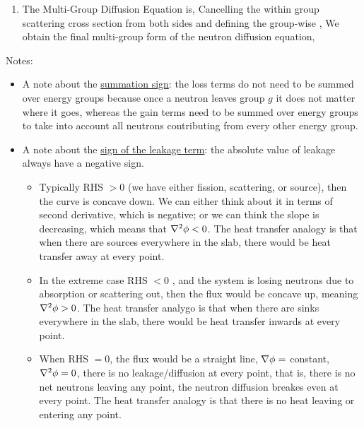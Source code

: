 \documentclass{school-22.211-notes}
\begin{document}
\begin{enumerate}
\begin{enumerate}
  \end{enumerate}

\item The Multi-Group Diffusion Equation is, 
Cancelling the within group scattering cross section from both sides and defining the group-wise , 
We obtain the final multi-group form of the neutron diffusion equation, 
\end{enumerate}
Notes:
\begin{itemize}
\item A note about the \uline{summation sign}: the loss terms do not need to be summed over energy groups because once a neutron leaves group $g$ it does not matter where it goes, whereas the gain terms need to be summed over energy groups to take into account all neutrons contributing from every other energy group. 

\item A note about the \uline{sign of the leakage term}: the absolute value of leakage always have a negative sign. 
  \begin{itemize}
  \item Typically RHS $>0$ (we have either fission, scattering, or source), then the curve is concave down. We can either think about it in terms of second derivative, which is negative; or we can think the slope is decreasing, which means that $\nabla^2 \phi < 0$. The heat transfer analogy is that when there are sources everywhere in the slab, there would be heat transfer away at every point. 
    
  \item In the extreme case RHS $<0$ , and the system is losing neutrons due to absorption or scattering out, then the flux would be concave up, meaning $\nabla^2 \phi > 0$. The heat transfer analygo is that when there are sinks everywhere in the slab, there would be heat transfer inwards at every point. 

  \item When RHS $=0$, the flux would be a straight line, $\nabla \phi = $ constant, $\nabla^2 \phi = 0$, there is no leakage/diffusion at every point, that is, there is no net neutrons leaving any point, the neutron diffusion breakes even at every point. The heat transfer analogy is that there is no heat leaving or entering any point. 
  \end{itemize}
\end{itemize}
\end{document}
